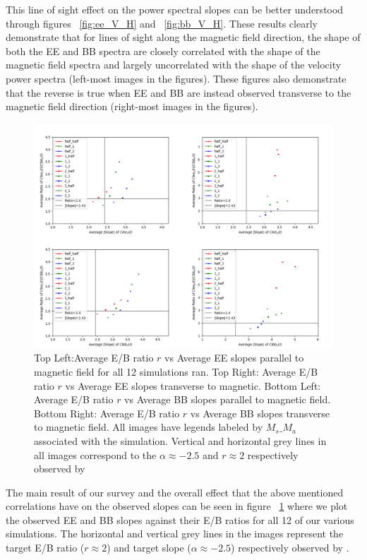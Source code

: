 This line of sight effect on the power spectral slopes can be better understood
through figures ~\ref{fig:ee_V_H} and ~\ref{fig:bb_V_H}. These results clearly
demonstrate that for lines of sight along the magnetic field direction, the
shape of both the EE and BB spectra are closely correlated with the shape of
the magnetic field spectra and largely uncorrelated with the shape of the
velocity power spectra (left-most images in the figures). These figures also
demonstrate that the reverse is true when EE and BB are instead observed transverse to the magnetic field direction (right-most images in the figures).

\begin{figure}[h]
\includegraphics[width=\linewidth]{ee_x_y_bb_x_y_paramspace.png}
\caption{Top Left:Average E/B ratio $r$ vs Average EE slopes parallel to
magnetic field for all 12 simulations ran. Top Right: Average E/B ratio $r$ vs
Average EE slopes transverse to magnetic. Bottom Left: Average E/B ratio $r$ vs
Average BB slopes parallel to magnetic field. Bottom Right: Average E/B ratio
$r$ vs Average BB slopes transverse to magnetic field. All images have legends
labeled by $M_{s}\_ M_{a}$ associated with the simulation. Vertical and
horizontal grey lines in all images correspond to the $\alpha\approx-2.5$ and
$r\approx2$ respectively observed by \citep{Planck18XI}}
\label{fig:slopes_ratios_param}
\end{figure}

The main result of our survey and the overall effect that the above mentioned
correlations have on the observed slopes can be seen in figure
~\ref{fig:slopes_ratios_param} where we plot the observed EE and BB slopes
against their E/B ratios for all 12 of our various simulations. The horizontal
and vertical grey lines in the images represent the target E/B ratio
($r\approx2$) and target slope ($\alpha\approx-2.5$) respectively observed by
\citep{Planck18XI}.


